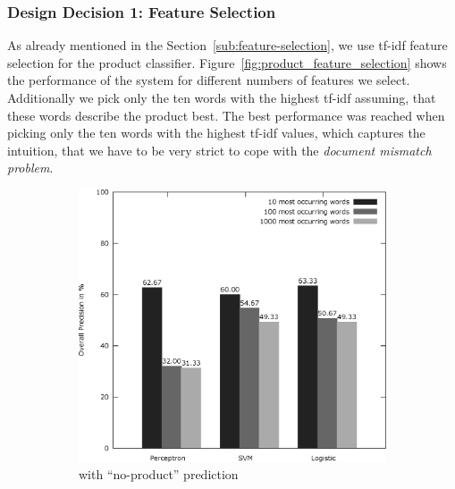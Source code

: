 \subsubsection{Design Decision 1: Feature Selection}
As already mentioned in the Section~\ref{sub:feature-selection}, we use tf-idf feature selection for the product classifier.
Figure~\ref{fig:product_feature_selection} shows the performance of the system for different numbers of features we select.
Additionally we pick only the ten words with the highest tf-idf assuming, that these words describe the product best.
The best performance was reached when picking only the ten words with the highest tf-idf values, which captures the intuition, that we have to be very strict to cope with the \emph{document mismatch problem}.
\begin{figure}[h!]
	\centering
	\begin{subfigure}[t]{0.5\textwidth}
		\includegraphics[width=\textwidth]{figures/product_feature_selection_with_none.eps}
		\caption{with ``no-product'' prediction}
	\end{subfigure}~
	\begin{subfigure}[t]{0.5\textwidth}

\end{subfigure}
\end{figure}
